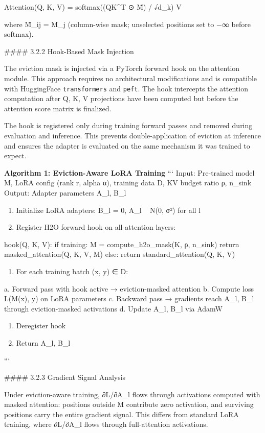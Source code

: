     Attention(Q, K, V) = softmax((QK^T ⊙ M̃) / √d_k) V

where M̃_{ij} = M_j (column-wise mask; unselected positions set to −∞ before softmax).

\#\#\#\# 3.2.2 Hook-Based Mask Injection

The eviction mask is injected via a PyTorch forward hook on the attention module. This approach requires no architectural modifications and is compatible with HuggingFace \texttt{transformers} and \texttt{peft}. The hook intercepts the attention computation after Q, K, V projections have been computed but before the attention score matrix is finalized.

The hook is registered only during training forward passes and removed during evaluation and inference. This prevents double-application of eviction at inference and ensures the adapter is evaluated on the same mechanism it was trained to expect.

\textbf{Algorithm 1: Eviction-Aware LoRA Training}
```
Input:  Pre-trained model M, LoRA config (rank r, alpha α),
        training data D, KV budget ratio ρ, n_sink
Output: Adapter parameters {A_l, B_l}

\begin{enumerate}
\item Initialize LoRA adapters: B_l = 0, A_l ~ N(0, σ²) for all l
\item Register H2O forward hook on all attention layers:
\end{enumerate}
   hook(Q, K, V):
     if training:
       M = compute_h2o_mask(K, ρ, n_sink)
       return masked_attention(Q, K, V, M)
     else:
       return standard_attention(Q, K, V)
\begin{enumerate}
\item For each training batch (x, y) ∈ D:
\end{enumerate}
   a. Forward pass with hook active → eviction-masked attention
   b. Compute loss L(M(x), y) on LoRA parameters
   c. Backward pass → gradients reach {A_l, B_l} through eviction-masked activations
   d. Update {A_l, B_l} via AdamW
\begin{enumerate}
\item Deregister hook
\item Return {A_l, B_l}
\end{enumerate}
```

\#\#\#\# 3.2.3 Gradient Signal Analysis

Under eviction-aware training, ∂L/∂A_l flows through activations computed with masked attention: positions outside M contribute zero activation, and surviving positions carry the entire gradient signal. This differs from standard LoRA training, where ∂L/∂A_l flows through full-attention activations.

